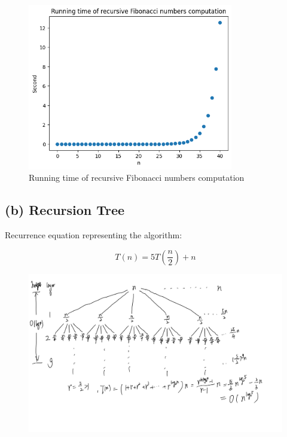 \documentclass[10pt]{article}
\begin{document}
\begin{enumerate}
{        \begin{figure}[H]
          \centering
          \includegraphics[width=0.8\textwidth]{../assets/runtimes_recursive.png}
          \caption{Running time of recursive Fibonacci numbers computation}
        \end{figure}
        }
\end{enumerate}

\subsection*{(b) Recursion Tree}

Recurrence equation representing the algorithm:

\[T(n) = 5T(\frac{n}{2}) + n\]

\begin{figure}[H]
  \centering
  \includegraphics[width=\linewidth]{../assets/1_b.png}
\end{figure}
\end{document}
